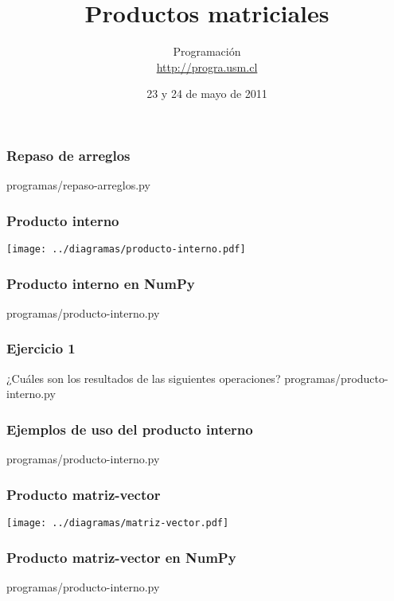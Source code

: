 \documentclass[12pt]{beamer}
\title{Productos matriciales}
\author{
  Programación \\ \url{http://progra.usm.cl}
}
\date{23 y 24 de mayo de 2011}
\begin{document}
  \begin{frame}
    \maketitle
  \end{frame}

  \begin{frame}
    \label{repaso-arreglos}
    \frametitle{Repaso de arreglos}
        {programas/repaso-arreglos.py}
  \end{frame}

  \begin{frame}
    \label{producto-interno}
    \frametitle{Producto interno}
    \texttt{[image: ../diagramas/producto-interno.pdf]}
  \end{frame}

  \begin{frame}
    \label{producto-interno-numpy}
    \frametitle{Producto interno en NumPy}
    
        {programas/producto-interno.py}
  \end{frame}

  \begin{frame}
    \label{ejercicios-producto-interno}
    \frametitle{Ejercicio 1}
    ¿Cuáles son los resultados
    de las siguientes operaciones?
        {programas/producto-interno.py}
  \end{frame}

  \begin{frame}
    \label{ejemplos-producto-interno}
    \frametitle{Ejemplos de uso del producto interno}
        {programas/producto-interno.py}
  \end{frame}

  \begin{frame}
    \label{producto-matriz-vector}
    \frametitle{Producto matriz-vector}
    \texttt{[image: ../diagramas/matriz-vector.pdf]}
  \end{frame}

  \begin{frame}
    \label{producto-matriz-vector-numpy}
    \frametitle{Producto matriz-vector en NumPy}
    
        {programas/producto-interno.py}
  \end{frame}
\end{document}
